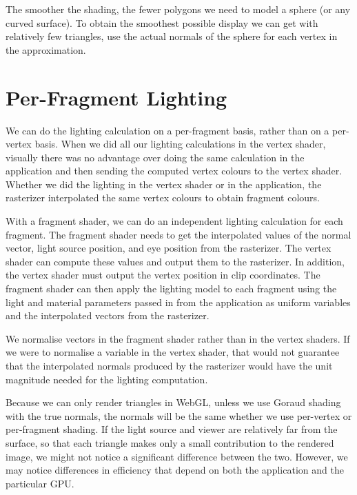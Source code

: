 \documentclass[../COS3712_Notes.tex]{subfiles}
\begin{document}
      The smoother the shading, the fewer polygons we need to model a sphere (or any curved surface).
      To obtain the smoothest possible display we can get with relatively few triangles,
      use the actual normals of the sphere for each vertex in the approximation.

    \section{Per-Fragment Lighting}
      We can do the lighting calculation on a per-fragment basis, rather than on a per-vertex basis.
      When we did all our lighting calculations in the vertex shader, visually there was no
      advantage over doing the same calculation in the application and then sending the computed
      vertex colours to the vertex shader.
      Whether we did the lighting in the vertex shader or in the application, the rasterizer
      interpolated the same vertex colours to obtain fragment colours.

      With a fragment shader, we can do an independent lighting calculation for each fragment.
      The fragment shader needs to get the interpolated values of the normal vector,
      light source position, and eye position from the rasterizer.
      The vertex shader can compute these values and output them to the rasterizer.
      In addition, the vertex shader must output the vertex position in clip coordinates.
      The fragment shader can then apply the lighting model to each fragment
      using the light and material parameters passed in from the application as uniform variables
      and the interpolated vectors from the rasterizer.

      We normalise vectors in the fragment shader rather than in the vertex shaders.
      If we were to normalise a variable in the vertex shader, that would not guarantee
      that the interpolated normals produced by the rasterizer would have the unit magnitude
      needed for the lighting computation.

      Because we can only render triangles in WebGL, unless we use Goraud shading with the true
      normals, the normals will be the same whether we use per-vertex or per-fragment shading.
      If the light source and viewer are relatively far from the surface,
      so that each triangle makes only a small contribution to the rendered image,
      we might not notice a significant difference between the two.
      However, we may notice differences in efficiency that depend on both the application
      and the particular GPU.
\end{document}
